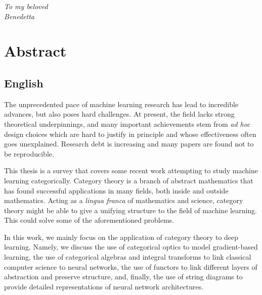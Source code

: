 \documentclass[11pt,a4paper,openright,twoside]{report}
\theoremstyle{plain}
\theoremstyle{definition}
\begin{document}




\begin{titlepage}
\thispagestyle{empty}                   
\topmargin=6.5cm                        
\raggedleft                             
\large 
                             
\em                                     
To my beloved\\
Benedetta                   
\newpage                                

\clearpage{\pagestyle{empty}\cleardoublepage}
\end{titlepage}



\chapter*{Abstract}   

\section*{English}

The unprecedented pace of machine learning research has lead to incredible advances, but also poses hard challenges. At present, the field lacks strong theoretical underpinnings, and many important achievements stem from \textit{ad hoc} design choices which are hard to justify in principle and whose effectiveness often goes unexplained. Research debt is increasing and many papers are found not to be reproducible. 

This thesis is a survey that covers some recent work attempting to study machine learning categorically. Category theory is a branch of abstract mathematics that has found successful applications in many fields, both inside and outside mathematics. Acting as a \textit{lingua franca} of mathematics and science, category theory might be able to give a unifying structure to the field of machine learning. This could solve some of the aforementioned problems. 

In this work, we mainly focus on the application of category theory to deep learning. Namely, we discuss the use of categorical optics to model gradient-based learning, the use of categorical algebras and integral transforms to link classical computer science to neural networks, the use of functors to link different layers of abstraction and preserve structure, and, finally, the use of string diagrams to provide detailed representations of neural network architectures.
\end{document}
